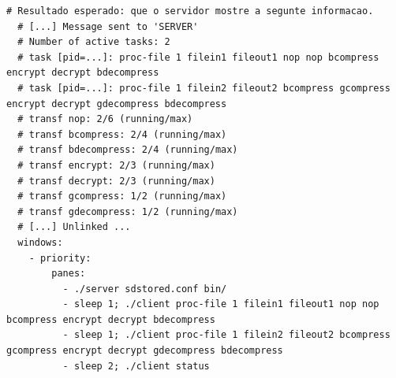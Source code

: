 \documentclass[11pt,a4paper]{report}%
\begin{document}
\begin{lstlisting}[caption={Exemplo de configurações Tmuxinator}]
  # Resultado esperado: que o servidor mostre a segunte informacao.
  # [...] Message sent to 'SERVER'
  # Number of active tasks: 2
  # task [pid=...]: proc-file 1 filein1 fileout1 nop nop bcompress encrypt decrypt bdecompress
  # task [pid=...]: proc-file 1 filein2 fileout2 bcompress gcompress encrypt decrypt gdecompress bdecompress
  # transf nop: 2/6 (running/max)
  # transf bcompress: 2/4 (running/max)
  # transf bdecompress: 2/4 (running/max)
  # transf encrypt: 2/3 (running/max)
  # transf decrypt: 2/3 (running/max)
  # transf gcompress: 1/2 (running/max)
  # transf gdecompress: 1/2 (running/max)
  # [...] Unlinked ...
  windows:
    - priority:
        panes:
          - ./server sdstored.conf bin/
          - sleep 1; ./client proc-file 1 filein1 fileout1 nop nop bcompress encrypt decrypt bdecompress
          - sleep 1; ./client proc-file 1 filein2 fileout2 bcompress gcompress encrypt decrypt gdecompress bdecompress
          - sleep 2; ./client status
\end{lstlisting}

\newpage



\end{document}
